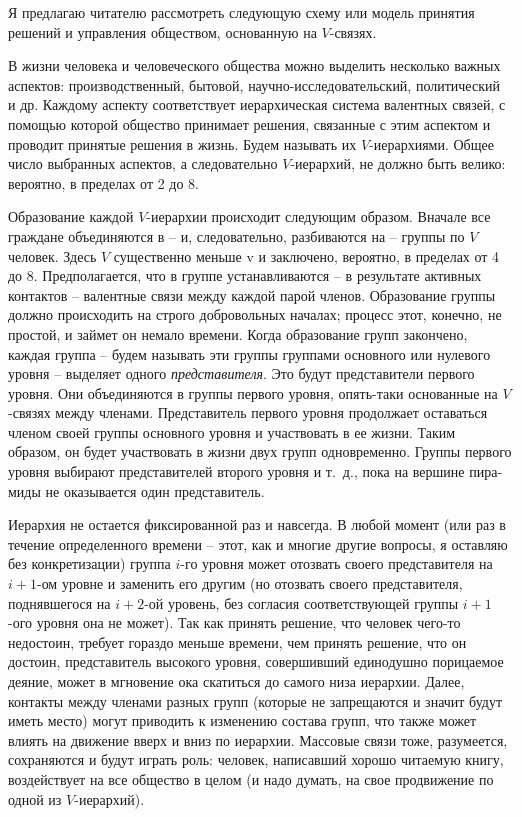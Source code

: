\documentclass{book}
\begin{document}
Я предлагаю читателю рассмотреть следующую схему или модель принятия решений и управления обществом, основан­ную на $V$-связях.

В жизни человека и человеческого общества можно выделить несколько важных аспектов: производственный, бытовой, научно-исследовательский, политический и др. Каждому аспекту соответствует иерархическая система валентных связей, с по­мощью которой общество принимает решения, связанные с этим аспектом и проводит принятые решения в жизнь. Будем назы­вать их $V$-иерархиями. Общее число выбранных аспектов, а сле­довательно  $V$-иерархий, не должно быть велико: вероятно, в пределах от 2 до 8.

Образование каждой $V$-иерархии происходит следующим образом. Вначале все граждане объединяются в -- и, следова­тельно, разбиваются на -- группы по $V$  человек. Здесь $V$  су­щественно меньше v и  заключено, вероятно, в пределах от 4 до 8. Предполагается, что в группе устанавливаются -- в резуль­тате активных контактов -- валентные связи между каждой па­рой членов. Образование группы должно происходить на строго добровольных началах; процесс этот, конечно, не простой, и займет он немало времени. Когда образование групп закончено, каждая группа -- будем называть эти группы группами основ­ного или нулевого уровня -- выделяет одного \textit{представителя}. Это будут представители первого уровня. Они объединяются в группы первого уровня, опять-таки основанные на $V$-связях между членами. Представитель первого уровня продолжает оставаться членом своей группы основного уровня и участво­вать в ее жизни. Таким образом, он будет участвовать в жизни двух групп одновременно. Группы первого уровня выбирают представителей второго уровня и т.~д., пока на вершине пира­миды не оказывается один представитель.

Иерархия не остается фиксированной раз и навсегда. В любой момент (или раз в течение определенного времени -- этот, как и многие другие вопросы, я оставляю без конкретизации) группа $i$-го уровня может отозвать своего представителя на $i+1$-ом уровне и заменить его другим (но отозвать своего представителя, поднявшегося на $i+2$-ой уровень, без согласия соответствующей группы $i+1$-ого уровня она не может). Так как принять решение, что человек чего-то недостоин, требует гораздо меньше времени, чем принять решение, что он достоин, представитель высокого уровня, совершивший единодушно порицаемое деяние, может в мгновение ока скатиться до само­го низа иерархии. Далее, контакты между членами разных групп (которые не запрещаются и значит будут иметь место) могут приводить к изменению состава групп, что также может влиять на движение вверх и вниз по иерархии. Массовые связи тоже, разумеется, сохраняются и будут играть роль: человек, написавший хорошо читаемую книгу, воздействует на все об­щество в целом (и надо 
думать, на свое продвижение по одной из $V$-иерархий).
\end{document}
